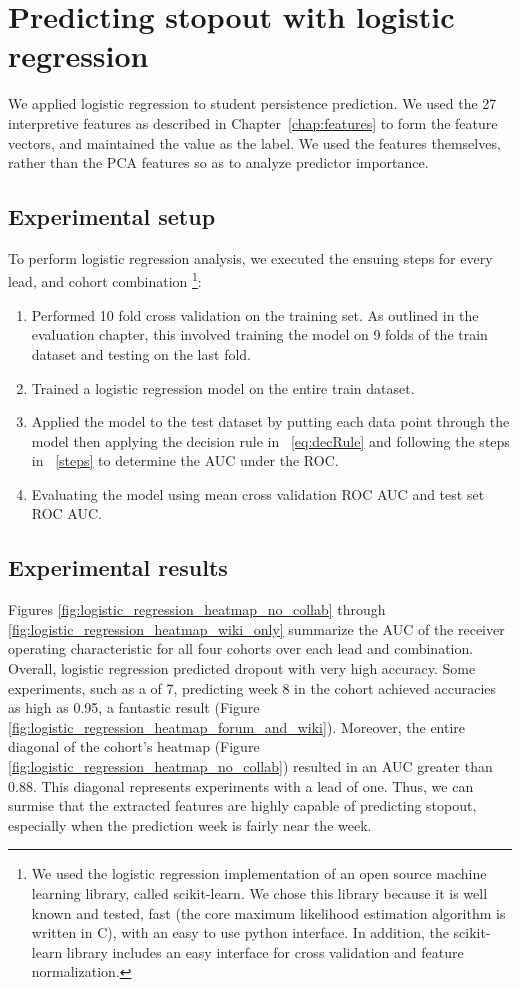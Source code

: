 \section{Predicting stopout with logistic regression}
We applied logistic regression to student persistence prediction. We used the 27 interpretive features as described in Chapter~\ref{chap:features} to form the feature vectors, and maintained the \sti value as the label. We used the features themselves, rather than the PCA features so as to analyze predictor importance.

\subsection{Experimental setup}
To perform logistic regression analysis, we executed the ensuing steps for every lead, \lag and cohort combination
\footnote{
We used the logistic regression implementation of an open source machine learning library, called scikit-learn. We chose this library because it is well known and tested, fast (the core maximum likelihood estimation algorithm is written in C), with an easy to use python interface. In addition, the scikit-learn library includes an easy interface for cross validation and feature normalization.}:
\begin{enumerate}
\item Performed 10 fold cross validation on the training set. As outlined in the evaluation chapter, this involved training the model on 9 folds of the train dataset and testing on the last fold.
\item Trained a logistic regression model on the entire train dataset.
\item Applied the model to the test dataset by putting each data point through the model then applying the decision rule in ~\ref{eq:decRule} and following the steps in ~\ref{steps} to determine the AUC under the ROC.
\item Evaluating the model using mean cross validation ROC AUC and test set ROC AUC.
\end{enumerate}

\subsection{Experimental results}
Figures \ref{fig:logistic_regression_heatmap_no_collab} through \ref{fig:logistic_regression_heatmap_wiki_only} summarize the AUC of the receiver operating characteristic for all four cohorts over each lead and \lag combination. Overall, logistic regression predicted dropout with very high accuracy. Some experiments, such as a \lag of 7, predicting week 8 in the \both cohort achieved accuracies as high as 0.95, a fantastic result (Figure \ref{fig:logistic_regression_heatmap_forum_and_wiki}). Moreover, the entire diagonal of the \neither cohort's heatmap (Figure \ref{fig:logistic_regression_heatmap_no_collab}) resulted in an AUC greater than 0.88. This diagonal represents experiments with a lead of one. Thus, we can surmise that the extracted features are highly capable of predicting stopout, especially when the prediction week is fairly near the \lag week.


